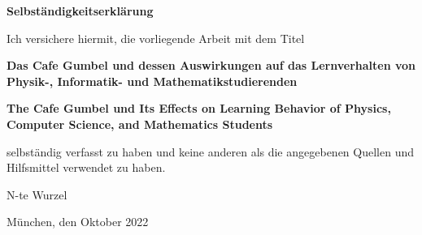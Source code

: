 \documentclass[a4paper,11pt,twoside,openright]{report}
\begin{document}
\vspace*{1cm}
{\huge \textbf{Selbst{\"a}ndigkeitserkl{\"a}rung}}\\
\vspace*{1.5cm}

Ich versichere hiermit, die vorliegende Arbeit mit dem Titel

\begin{center}
	\textbf{Das Cafe Gumbel und dessen Auswirkungen auf das Lernverhalten von Physik-, Informatik- und Mathematikstudierenden}\\
\end{center}
\begin{center}
	\textbf{The Cafe Gumbel und Its Effects on Learning Behavior of Physics, Computer Science, and Mathematics Students}
\end{center}

selbst{\"a}ndig verfasst zu haben und keine anderen als die angegebenen Quellen und Hilfsmittel verwendet zu haben.

\vspace*{3cm}

N-te Wurzel

\vspace*{1cm}
M{\"u}nchen, den \hspace*{2cm} Oktober 2022
\end{document}
